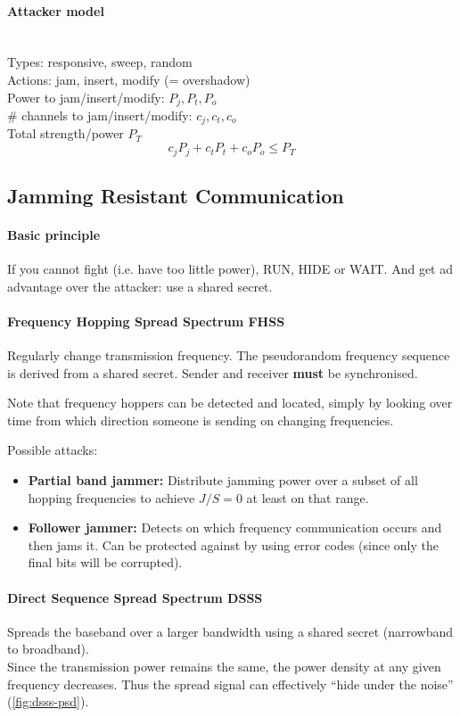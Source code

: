 \paragraph{Attacker model} \mbox{} \\
Types: responsive, sweep, random \\
Actions: jam, insert, modify (= overshadow) \\
Power to jam/insert/modify: $P_j, P_t, P_o$ \\
\# channels to jam/insert/modify: $c_j, c_t, c_o$ \\
Total strength/power $P_T$ \\
$$ c_j P_j + c_t P_t + c_o P_o \leq P_T$$

\subsection{Jamming Resistant Communication}

\paragraph{Basic principle}
If you cannot fight (i.e. have too little power), RUN, HIDE or WAIT.
And get ad advantage over the attacker: use a shared secret.

\paragraph{Frequency Hopping Spread Spectrum FHSS}
Regularly change transmission frequency.
The pseudorandom frequency sequence is derived from a shared secret.
Sender and receiver \textbf{must} be synchronised.

Note that frequency hoppers can be detected and located, simply by looking over time from which direction someone is sending on changing frequencies.

Possible attacks:
\begin{itemize}
	\item \textbf{Partial band jammer:}
	Distribute jamming power over a subset of all hopping frequencies to achieve $J/S=0$ at least on that range.
	\item \textbf{Follower jammer:}
	Detects on which frequency communication occurs and then jams it.
	Can be protected against by using error codes (since only the final bits will be corrupted).
\end{itemize}

\paragraph{Direct Sequence Spread Spectrum DSSS}
Spreads the baseband over a larger bandwidth using a shared secret (narrowband to broadband). \\
Since the transmission power remains the same, the power density at any given frequency decreases.
Thus the spread signal can effectively ``hide under the noise'' (\autoref{fig:dsss-psd}).

